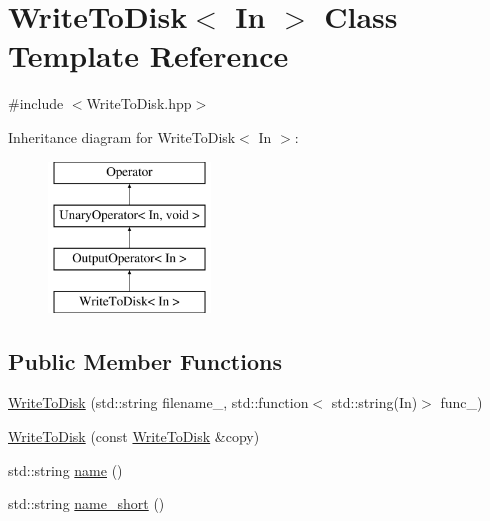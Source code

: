 \hypertarget{class_write_to_disk}{\section{\-Write\-To\-Disk$<$ \-In $>$ \-Class \-Template \-Reference}
\label{class_write_to_disk}
}


{\ttfamily \#include $<$\-Write\-To\-Disk.\-hpp$>$}

\-Inheritance diagram for \-Write\-To\-Disk$<$ \-In $>$\-:\begin{figure}[H]
\begin{center}
\leavevmode
\includegraphics[height=4.000000cm]{class_write_to_disk}
\end{center}
\end{figure}
\subsection*{\-Public \-Member \-Functions}
\begin{DoxyCompactItemize}
\item 
\hyperlink{class_write_to_disk_a32f70bda46bddcfb63fa4dc1c98caaab}{\-Write\-To\-Disk} (std\-::string filename\-\_\-, std\-::function$<$ std\-::string(\-In)$>$ func\-\_\-)
\item 
\hyperlink{class_write_to_disk_abbdea3010854bb53dfef3f5c006fc245}{\-Write\-To\-Disk} (const \hyperlink{class_write_to_disk}{\-Write\-To\-Disk} \&copy)
\item 
std\-::string \hyperlink{class_write_to_disk_a3b57dac20171d5e166210183bceedea2}{name} ()
\item 
std\-::string \hyperlink{class_write_to_disk_ab7f18e8983197d9917d2d045943b00ca}{name\-\_\-short} ()
\end{DoxyCompactItemize}
